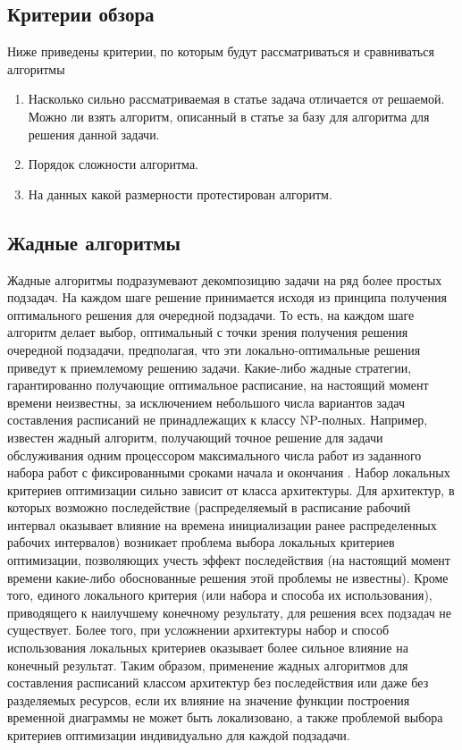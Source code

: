 \subsection{Критерии обзора}
Ниже приведены критерии, по которым будут рассматриваться и сравниваться алгоритмы
\begin{enumerate}
    \item Насколько сильно рассматриваемая в статье задача отличается от решаемой. Можно ли взять алгоритм, описанный в статье за базу для алгоритма для решения данной задачи.
    \item Порядок сложности алгоритма.
    \item На данных какой размерности протестирован алгоритм.
\end{enumerate}
\subsection{Жадные алгоритмы}
Жадные алгоритмы подразумевают декомпозицию задачи на ряд более простых подзадач. На каждом шаге решение принимается исходя из принципа получения оптимального решения для очередной подзадачи. То есть, на каждом шаге алгоритм делает выбор, оптимальный с точки зрения получения решения очередной подзадачи, предполагая, что эти локально-оптимальные решения приведут к приемлемому решению задачи. Какие-либо жадные стратегии, гарантированно получающие оптимальное расписание, на настоящий момент времени неизвестны, за исключением небольшого числа вариантов задач составления расписаний не принадлежащих к классу NP-полных. Например, известен жадный алгоритм, получающий точное решение для задачи обслуживания одним процессором максимального числа работ из заданного набора работ с фиксированными сроками начала и окончания \cite{Cormen}. Набор локальных критериев оптимизации сильно зависит от класса архитектуры. Для архитектур, в которых возможно последействие (распределяемый в расписание рабочий интервал оказывает влияние на времена инициализации ранее распределенных рабочих интервалов) возникает проблема выбора локальных критериев оптимизации, позволяющих учесть эффект последействия (на настоящий момент времени какие-либо обоснованные решения этой проблемы не известны). Кроме того, единого локального критерия (или набора и способа их использования), приводящего к наилучшему конечному результату, для решения всех подзадач не существует. Более того, при усложнении архитектуры набор и способ использования локальных критериев оказывает более сильное влияние на конечный результат. Таким образом, применение жадных алгоритмов для составления расписаний классом архитектур без последействия или даже без разделяемых ресурсов, если их влияние на значение функции построения временной диаграммы не может быть локализовано, а также проблемой выбора критериев оптимизации индивидуально для каждой подзадачи.

